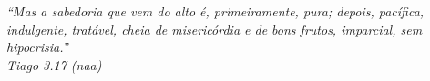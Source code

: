 \newpage

\vspace*{\fill}
\begin{flushright}
    {\itshape
    ``Mas a sabedoria que vem do alto é, primeiramente, pura; depois, pacífica, indulgente, tratável, cheia de misericórdia e de bons frutos, imparcial, sem hipocrisia.''\\[0.5cm]
    \textemdash{} Tiago 3.17 (\gls{naa})
    }
\end{flushright}
\vspace*{1cm}
